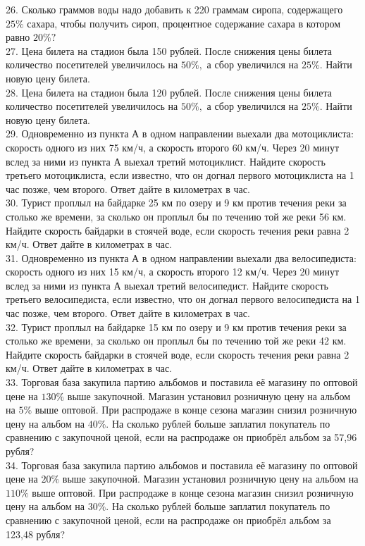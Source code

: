 26. Сколько граммов воды надо добавить к 220 граммам сиропа, содержащего $25\%$ сахара, чтобы получить сироп, процентное содержание сахара в котором равно $20\%?$\\
27. Цена билета на стадион была 150 рублей. После снижения цены билета количество посетителей увеличилось на $50\%,$ а сбор увеличился на $25\%.$ Найти новую цену билета.\\
28. Цена билета на стадион была 120 рублей. После снижения цены билета количество посетителей увеличилось на $50\%,$ а сбор увеличился на $25\%.$ Найти новую цену билета.\\
29. Одновременно из пункта А в одном направлении выехали два мотоциклиста: скорость одного из них 75 км/ч, а скорость второго 60 км/ч. Через 20 минут вслед за ними из пункта А выехал третий мотоциклист. Найдите скорость третьего мотоциклиста, если известно, что он догнал первого мотоциклиста на 1 час позже, чем второго. Ответ дайте в километрах в час.\\
30. Турист проплыл на байдарке 25 км по озеру и 9 км против течения реки за столько же времени, за сколько он проплыл бы по течению той же реки 56 км. Найдите скорость байдарки в стоячей воде, если скорость течения реки равна 2 км/ч. Ответ дайте в километрах в час.\\
31. Одновременно из пункта А в одном направлении выехали два велосипедиста: скорость одного из них 15 км/ч, а скорость второго 12 км/ч. Через 20 минут вслед за ними из пункта А выехал третий велосипедист. Найдите скорость третьего велосипедиста, если известно, что он догнал первого велосипедиста на 1 час позже, чем второго. Ответ дайте в километрах в час.\\
32. Турист проплыл на байдарке 15 км по озеру и 9 км против течения реки за столько же времени, за сколько он проплыл бы по течению той же реки 42 км. Найдите скорость байдарки в стоячей воде, если скорость течения реки равна 2 км/ч. Ответ дайте в километрах в час.\\
33. Торговая база закупила партию альбомов и поставила её магазину по оптовой цене на $130\%$ выше закупочной. Магазин установил розничную цену на альбом на $5\%$ выше оптовой. При распродаже в конце сезона магазин снизил розничную цену на альбом на $40\%.$ На сколько рублей больше заплатил покупатель по сравнению с закупочной ценой, если на распродаже он приобрёл альбом за 57,96 рубля?\\
34. Торговая база закупила партию альбомов и поставила её магазину по оптовой цене на $20\%$ выше закупочной. Магазин установил розничную цену на альбом на $110\%$ выше оптовой. При распродаже в конце сезона магазин снизил розничную цену на альбом на $30\%.$ На сколько рублей больше заплатил покупатель по сравнению с закупочной ценой, если на распродаже он приобрёл альбом за 123,48 рубля?\\
